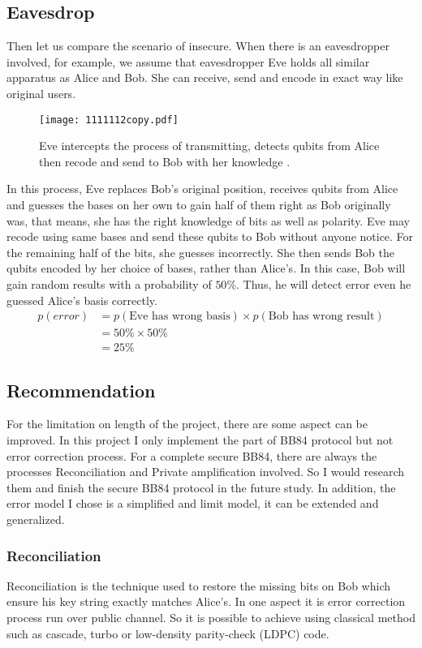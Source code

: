 \documentclass[12pt]{article}
\begin{document}
\subsection{Eavesdrop}
Then let us compare the scenario of insecure. When there is an eavesdropper involved, for example, we assume that eavesdropper Eve holds all similar apparatus as Alice and Bob. She can receive, send and encode in exact way like original users. 
\begin{figure}[H]
\begin{center}
\texttt{[image: 1111112copy.pdf]}
\end{center}
\caption{Eve intercepts the process of transmitting, detects qubits from Alice then recode and send to Bob with her knowledge \cite[p.252]{fox2006quantum}.}
\end{figure}
In this process, Eve replaces Bob's original position, receives qubits from Alice and guesses the bases on her own to gain half of them right as Bob originally was, that means, she has the right knowledge of bits as well as polarity. Eve may recode using same bases and send these qubits to Bob without anyone notice. For the remaining half of the bits, she guesses incorrectly. She then sends Bob the qubits encoded by her choice of bases, rather than Alice's. In this case, Bob will gain random results with a probability of $50\%$. Thus, he will detect error even he guessed Alice's basis correctly.
\begin{equation}
\begin{aligned}
	p(error)&=p(\text{Eve has wrong basis})\times p(\text{Bob has wrong result})\\
&=50\%\times 50\%\\
&=25\%
\end{aligned}
\end{equation}

\subsection{Recommendation}
For the limitation on length of the project, there are some aspect can be improved. In this project I only implement the part of BB84 protocol but not error correction process. For a complete secure BB84, there are always the processes Reconciliation and Private amplification involved. So I would research them and finish the secure BB84 protocol in the future study. In addition, the error model I chose is a simplified and limit model, it can be extended and generalized.
\subsubsection{Reconciliation}
Reconciliation is the technique used to restore the missing bits on Bob which ensure his key string exactly matches Alice's. In one aspect it is error correction process run over public channel. So it is possible to achieve using classical method such as cascade, turbo or low-density parity-check (LDPC) code.
\end{document}
